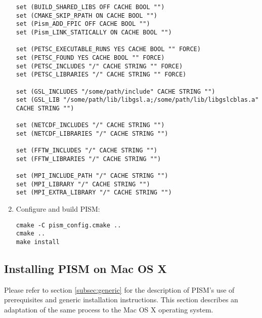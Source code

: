 \documentclass[titlepage,letterpaper,final]{scrartcl}
\begin{document}
\begin{enumerate}
\begin{verbatim}
set (BUILD_SHARED_LIBS OFF CACHE BOOL "")
set (CMAKE_SKIP_RPATH ON CACHE BOOL "")
set (Pism_ADD_FPIC OFF CACHE BOOL "")
set (Pism_LINK_STATICALLY ON CACHE BOOL "")

set (PETSC_EXECUTABLE_RUNS YES CACHE BOOL "" FORCE)
set (PETSC_FOUND YES CACHE BOOL "" FORCE)
set (PETSC_INCLUDES "/" CACHE STRING "" FORCE)
set (PETSC_LIBRARIES "/" CACHE STRING "" FORCE)

set (GSL_INCLUDES "/some/path/include" CACHE STRING "")
set (GSL_LIB "/some/path/lib/libgsl.a;/some/path/lib/libgslcblas.a" CACHE STRING "")

set (NETCDF_INCLUDES "/" CACHE STRING "")
set (NETCDF_LIBRARIES "/" CACHE STRING "")

set (FFTW_INCLUDES "/" CACHE STRING "")
set (FFTW_LIBRARIES "/" CACHE STRING "")

set (MPI_INCLUDE_PATH "/" CACHE STRING "")
set (MPI_LIBRARY "/" CACHE STRING "")
set (MPI_EXTRA_LIBRARY "/" CACHE STRING "")
\end{verbatim}
\item Configure and build PISM:
\begin{verbatim}
cmake -C pism_config.cmake ..
cmake ..
make install
\end{verbatim}
\end{enumerate}




\subsection{Installing PISM on Mac OS X}  \label{subsec:macosx}

Please refer to section \ref{subsec:generic} for the description of PISM's use of prerequisites and generic installation
instructions. This section describes an adaptation of the same process to the Mac OS X operating system.
\end{document}
